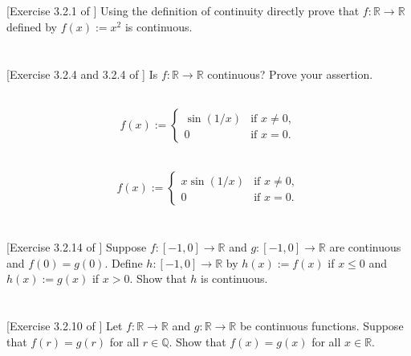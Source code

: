 \documentclass[11pt,letterpaper]{article}
\begin{document}
\section{} [Exercise 3.2.1 of \cite{Lebl_23}] 
Using the definition of continuity directly prove that $f: \mathbb{R}\to \mathbb{R}$ defined by $f(x) := x^2$ is continuous.

\section{} [Exercise 3.2.4 and 3.2.4 of \cite{Lebl_23}] 
Is $f: \mathbb{R}\to \mathbb{R}$ continuous? Prove your assertion.

\subsection{}
\begin{align}
    f(x) := \begin{cases}
        \sin(1/x) &\text{if } x\neq 0,\\
        0  &\text{if } x= 0.
    \end{cases}
\end{align}

\subsection{}
\begin{align}
    f(x) := \begin{cases}
        x\sin(1/x) &\text{if } x\neq 0,\\
        0  &\text{if } x= 0.
    \end{cases}
\end{align}

\section{} [Exercise 3.2.14 of \cite{Lebl_23}] 
Suppose $f:[-1,0]\to \mathbb{R}$ and $g:[-1,0]\to \mathbb{R}$ are continuous and $f(0)=g(0)$. Define $h:[-1,0]\to \mathbb{R}$ by $h(x) := f(x)$ if $x\leq 0$ and $h(x):= g(x)$ if $x>0$. Show that $h$ is continuous.

\section{} [Exercise 3.2.10 of \cite{Lebl_23}] 
Let $f:\mathbb{R}\to \mathbb{R}$ and $g:\mathbb{R}\to \mathbb{R}$ be continuous functions. Suppose that $f(r)=g(r)$ for all $r\in\mathbb{Q}$. Show that $f(x)=g(x)$ for all $x\in\mathbb{R}$. 
\end{document}
